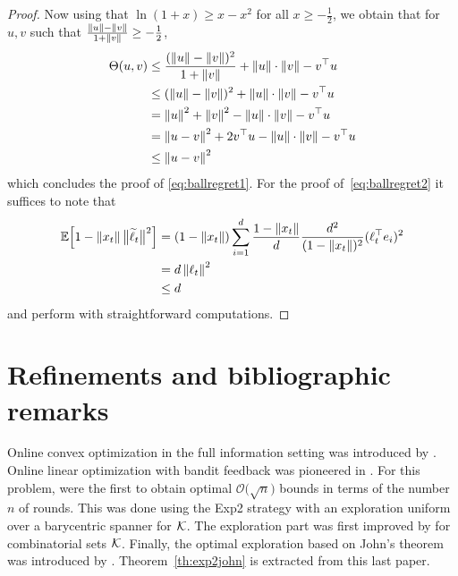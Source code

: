\begin{proof}
Now using that $\ln(1+x) \geq x -x^2$ for all $x \geq - \frac12$, we obtain that for $u,v$ such that $\frac{\left\|{u}\right\| - \left\|{v}\right\|}{1 + \left\|{v}\right\|} \geq - \frac{1}{2}$,
\begin{align*}
\Theta(u,v) & \leq \frac{(\left\|{u}\right\| - \left\|{v}\right\|)^2}{1 + \left\|{v}\right\|} + \left\|{u}\right\| \cdot \left\|{v}\right\| - v^{\top} u \\ 
& \leq (\left\|{u}\right\| - \left\|{v}\right\|)^2 + \left\|{u}\right\| \cdot \left\|{v}\right\| - v^{\top} u \\
& = \left\|{u}\right\|^2 + \left\|{v}\right\|^2 - \left\|{u}\right\| \cdot \left\|{v}\right\| - v^{\top} u \\
& = \left\|{u - v}\right\|^2 + 2 v^{\top} u - \left\|{u}\right\| \cdot \left\|{v}\right\| - v^{\top} u \\
& \leq \left\|{u - v}\right\|^2
\end{align*}
which concludes the proof of \eqref{eq:ballregret1}. For the proof of~\eqref{eq:ballregret2} it suffices to note that
\begin{align*}
\mathbb{E}\Bigl[1 - \left\|{x_t}\right\|\big\|\widetilde{\ell}_t\big\|^2\Bigr]  & = (1- \left\|{x_t}\right\|) \sum_{i=1}^d  \frac{1 - \left\|{x_t}\right\|}{d} \frac{d^2}{(1 - \left\|{x_t}\right\|)^2} (\ell_t^{\top} e_i)^2 \\
&  = d \left\|{\ell_t}\right\|^2 \\
& \le d
\end{align*}
and perform with straightforward computations.
\end{proof}

\section{Refinements and bibliographic remarks}
Online convex optimization in the full information setting was introduced by \cite{Zin03}. Online linear optimization with bandit feedback was pioneered in \cite{AK04, MB04}. For this problem, \cite{DHK08} were the first to obtain optimal $\mathcal{O}\bigl(\sqrt{n}\bigr)$ bounds in terms of the number $n$ of rounds. This was done using the Exp2 strategy with an exploration uniform over a barycentric spanner for $\mathcal{K}$. The exploration part was first improved by \cite{CL11} for combinatorial sets $\mathcal{K}$. Finally, the optimal exploration based on John's theorem was introduced by \cite{BCK12}. Theorem~\ref{th:exp2john} is extracted from this last paper.

